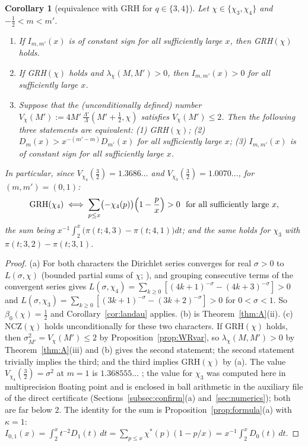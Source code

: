 \documentclass[11pt]{amsart}
\newtheorem{corollary}[theorem]{Corollary}
\theoremstyle{definition}
\numberwithin{equation}{section}
\begin{document}
\begin{corollary}[equivalence with GRH for $q\in\{3,4\}$]
\label{cor:equiv}
Let $\chi\in\{\chi_3,\chi_4\}$ and $-\tfrac12<m<m'$.
\begin{enumerate}
\item[(a)] If $I_{m,m'}(x)$ is of constant sign for all sufficiently
large $x$, then GRH$(\chi)$ holds.
\item[(b)] If GRH$(\chi)$ holds and $\lambda_\chi(M,M')>0$, then
$I_{m,m'}(x)>0$ for all sufficiently large $x$.
\item[(c)] Suppose that the (unconditionally defined) number
$V_\chi(M'):=4M'\,\frac{\Lambda'}{\Lambda}(M'+\tfrac12,\chi)$ satisfies
$V_\chi(M')\le2$. Then the following three statements are
equivalent: (1) GRH$(\chi)$; (2) $D_m(x)>x^{-(m'-m)}D_{m'}(x)$ for
all sufficiently large $x$; (3) $I_{m,m'}(x)$ is of constant sign
for all sufficiently large $x$.
\end{enumerate}
In particular, since $V_{\chi_4}(\tfrac32)=1.3686\ldots$ and
$V_{\chi_3}(\tfrac32)=1.0070\ldots$, for $(m,m')=(0,1)$:
\[
\text{GRH}(\chi_4)\iff
\sum_{p\le x}\bigl(-\chi_4(p)\bigr)\Bigl(1-\frac px\Bigr)>0
\ \text{ for all sufficiently large }x ,
\]
the sum being $x^{-1}\int_2^x\bigl(\pi(t;4,3)-\pi(t;4,1)\bigr)dt$; and
the same holds for $\chi_3$ with $\pi(t;3,2)-\pi(t;3,1)$.
\end{corollary}

\begin{proof}
(a) For both characters the Dirichlet series converges for real
$\sigma>0$ to $L(\sigma,\chi)$ (bounded partial sums of $\chi$;
\cite[Ch.~4]{Dav00}), and grouping consecutive terms of the
convergent series gives
$L(\sigma,\chi_4)=\sum_{k\ge0}[(4k+1)^{-\sigma}-(4k+3)^{-\sigma}]>0$
and
$L(\sigma,\chi_3)=\sum_{k\ge0}[(3k+1)^{-\sigma}-(3k+2)^{-\sigma}]>0$
for $0<\sigma<1$. So $\beta_0(\chi)=\tfrac12$ and
Corollary~\ref{cor:landau} applies. (b) is Theorem~\ref{thm:A}(ii).
(c) NCZ$(\chi)$ holds unconditionally for these two characters. If
GRH$(\chi)$ holds, then $\sigma_{M'}^2=V_\chi(M')\le2$ by
Proposition~\ref{prop:WRvar}, so $\lambda_\chi(M,M')>0$ by
Theorem~\ref{thm:A}(iii) and (b) gives the second statement; the
second statement trivially implies the third; and the third implies
GRH$(\chi)$ by (a). The value $V_{\chi_4}(\tfrac32)=\sigma^2$ at
$m=1$ is $1.368555\ldots$ \cite[Table~2]{WR}; the value for $\chi_3$
was computed here in multiprecision floating point and is enclosed in
ball arithmetic in the auxiliary file of the direct certificate
(Sections~\ref{subsec:confirm}(a) and~\ref{sec:numerics}); both are far below $2$. The
identity for the sum is Proposition~\ref{prop:formula}(a) with
$\kappa=1$: $I_{0,1}(x)=\int_2^xt^{-2}D_1(t)\,dt
=\sum_{p\le x}\chi^*(p)(1-p/x)=x^{-1}\int_2^xD_0(t)\,dt$.
\end{proof}
\end{document}
